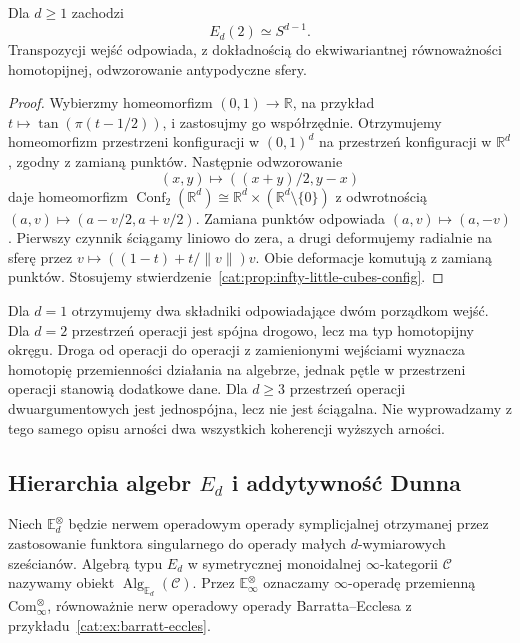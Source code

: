 \begin{wniosek}\label{cat:cor:infty-little-cubes-binary}
Dla $d\geq1$ zachodzi
\[
 E_d(2)\simeq S^{d-1}.
\]
Transpozycji wejść odpowiada, z dokładnością do ekwiwariantnej równoważności homotopijnej, odwzorowanie antypodyczne sfery.
\end{wniosek}
\begin{proof}
Wybierzmy homeomorfizm $(0,1)\to\mathbb R$, na przykład $t\mapsto\tan(\pi(t-1/2))$, i zastosujmy go współrzędnie. Otrzymujemy homeomorfizm przestrzeni konfiguracji w $(0,1)^d$ na przestrzeń konfiguracji w $\mathbb R^d$, zgodny z zamianą punktów. Następnie odwzorowanie
\[
 (x,y)\longmapsto ((x+y)/2,y-x)
\]
daje homeomorfizm $\operatorname{Conf}_2(\mathbb R^d)\cong\mathbb R^d\times(\mathbb R^d\setminus\{0\})$ z odwrotnością $(a,v)\mapsto(a-v/2,a+v/2)$. Zamiana punktów odpowiada $(a,v)\mapsto(a,-v)$. Pierwszy czynnik ściągamy liniowo do zera, a drugi deformujemy radialnie na sferę przez $v\mapsto ((1-t)+t/\|v\|)v$. Obie deformacje komutują z zamianą punktów. Stosujemy stwierdzenie~\ref{cat:prop:infty-little-cubes-config}.
\end{proof}

Dla $d=1$ otrzymujemy dwa składniki odpowiadające dwóm porządkom wejść. Dla $d=2$ przestrzeń operacji jest spójna drogowo, lecz ma typ homotopijny okręgu. Droga od operacji do operacji z zamienionymi wejściami wyznacza homotopię przemienności działania na algebrze, jednak pętle w przestrzeni operacji stanowią dodatkowe dane. Dla $d\geq3$ przestrzeń operacji dwuargumentowych jest jednospójna, lecz nie jest ściągalna. Nie wyprowadzamy z tego samego opisu arności dwa wszystkich koherencji wyższych arności.

\subsection{Hierarchia algebr \texorpdfstring{$E_d$}{Ed} i addytywność Dunna}

\begin{definicja}\label{cat:def:infty-en-algebra}
Niech $\mathbb E_d^\otimes$ będzie nerwem operadowym operady symplicjalnej otrzymanej przez zastosowanie funktora singularnego do operady małych $d$-wymiarowych sześcianów. Algebrą typu $E_d$ w symetrycznej monoidalnej $\infty$-kategorii $\mathcal C$ nazywamy obiekt $\operatorname{Alg}_{\mathbb E_d}(\mathcal C)$. Przez $\mathbb E_\infty^\otimes$ oznaczamy $\infty$-operadę przemienną $\mathrm{Com}_\infty^\otimes$, równoważnie nerw operadowy operady Barratta--Ecclesa z przykładu~\ref{cat:ex:barratt-eccles}.
\end{definicja}


